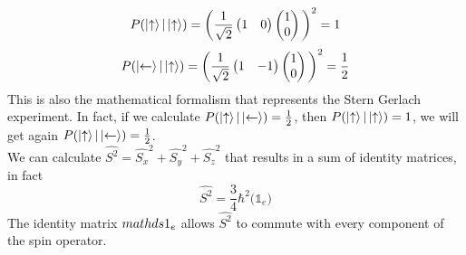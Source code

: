 \[
P(\ket{\uparrow}|\ket{\uparrow})=\bigg(\frac{1}{\sqrt{2}}\begin{pmatrix}1&0\end{pmatrix}\begin{pmatrix}1\\0\end{pmatrix}\bigg)^2=1
\]
\[
P(\ket{\leftarrow}|\ket{\uparrow})=\bigg(\frac{1}{\sqrt{2}}\begin{pmatrix}1&-1\end{pmatrix}\begin{pmatrix}1\\0\end{pmatrix}\bigg)^2=\frac{1}{2}
\]
This is also the mathematical formalism that represents the Stern Gerlach experiment. In fact, if we calculate $P(\ket{\uparrow}|\ket{\leftarrow}) = \frac{1}{2}$, then $P(\ket{\uparrow}|\ket{\uparrow}) = 1$, we will get again $P(\ket{\uparrow}|\ket{\leftarrow}) = \frac{1}{2}$.  \\
We can calculate $\hat{S^2} = \hat{S_x}^2+\hat{S_y}^2+\hat{S_z}^2$ that results in a sum of identity matrices, in fact
\[\hat{S^2}=\frac{3}{4}\hbar^2\big(\mathds{1}_e\big)\]
The identity matrix $\\mathds{1}_e$ allows $\hat{S^2}$ to commute with every component of the spin operator.

